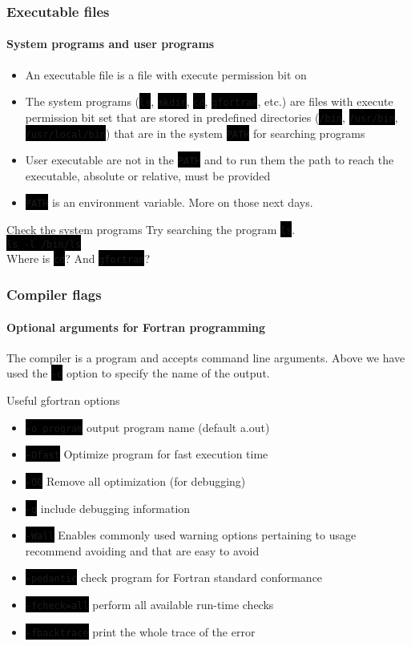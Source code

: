\documentclass[unknownkeysallowed, 10pt, a4 paper, handout]{beamer}
\newcommand{\code}[1]{\colorbox{black}{\color{green}\texttt{#1}}}
\begin{document}
\begin{frame}[label=executables]
  \frametitle{Executable files}
  \framesubtitle{System programs and user programs}
  \begin{itemize}
    \item An executable file is a file with execute permission bit on
    \item The system programs (\code{ls}, \code{mkdir}, \code{cd},
      \code{gfortran}, etc.) are files with execute permission bit set
      that are stored in predefined directories (\code{/bin}, \code{/usr/bin},
      \code{/usr/local/bin}) that are in the system \code{PATH} for
      searching programs
    \item User executable are not in the \code{PATH} and to run them the
      path to reach the executable, absolute or relative, must be provided
    \item \code{PATH} is an environment variable. More on those next days.
  \end{itemize}
  \begin{alertblock}{Check the system programs}
      Try searching the program \code{ls}. \\
      \code{ls -l /bin/ls} \\
      Where is \code{cd}? And \code{gfortran}?
   \end{alertblock}
\end{frame}


\begin{frame}[label=compiler]
  \frametitle{Compiler flags}
  \framesubtitle{Optional arguments for Fortran programming}
  The compiler is a program and accepts command line arguments. Above we
    have used the \code{-o} option to specify the name of the output.
  \begin{block}{Useful gfortran options}
    \begin{itemize}
        \item \code{-o program} output program name (default a.out)
      \item \code{-Ofast} Optimize program for fast execution time
      \item \code{-O0} Remove all optimization (for debugging)
      \item \code{-g} include debugging information
      \item \code{-Wall} Enables commonly used warning options pertaining to
          usage recommend avoiding and that are easy to avoid
      \item \code{-pedantic} check program for Fortran standard conformance
      \item \code{-fcheck=all} perform all available run-time checks
      \item \code{-fbacktrace} print the whole trace of the error
  \end{itemize}
  \end{block}
\end{frame}
\end{document}
